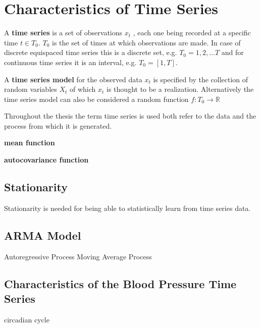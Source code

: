 

\chapter{Characteristics of Time Series}

A \textbf{time series} is a set of observations $x_t$ , each one being recorded at a specific time $t \in T_0$.
$T_0$ is the set of times at which observations are made.
In case of discrete equispaced time series this is a discrete set, e.g. $T_0 = {1, 2, \dots T}$
and for continuous time series it is an interval, e.g. $T_0 = [1, T]$.

A \textbf{time series model} for the observed data ${x_t}$ is specified by the collection of random variables
${X_t}$ of which ${x_t}$ is thought to be a realization.
Alternatively the time series model can also be considered a random function $f: T_0 \to \mathbb{R}$

Throughout the thesis the term time series is used both refer to the data and the process from which it is generated.


\textbf{mean function}

\textbf{autocovariance function}


\section{Stationarity}
Stationarity is needed for being able to statistically learn from time series data.



\section{ARMA Model}

Autoregressive Process
Moving Average Process



\section{Characteristics of the Blood Pressure Time Series}

circadian cycle

